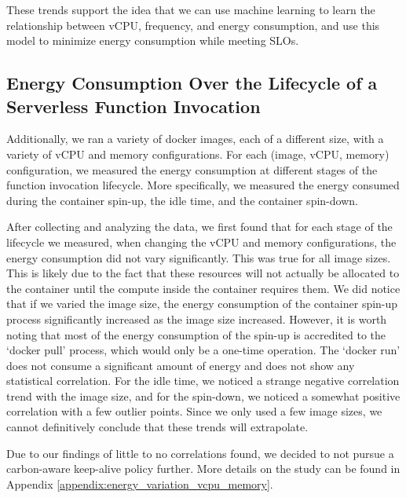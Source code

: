 \documentclass[times, 10pt,twocolumn]{article}
\begin{document}
These trends support the idea that we can use machine learning to learn the relationship between vCPU, frequency, and energy consumption, and use this model to minimize energy consumption while meeting SLOs.

\subsection{Energy Consumption Over the Lifecycle of a Serverless Function Invocation}
Additionally, we ran a variety of docker images, each of a different size, with a variety of vCPU and memory configurations. For each (image, vCPU, memory) configuration, we measured the energy consumption at different stages of the function invocation lifecycle. More specifically, we measured the energy consumed during the container spin-up, the idle time, and the container spin-down.

After collecting and analyzing the data, we first found that for each stage of the lifecycle we measured, when changing the vCPU and memory configurations, the energy consumption did not vary significantly. This was true for all image sizes. This is likely due to the fact that these resources will not actually be allocated to the container until the compute inside the container requires them. We did notice that if we varied the image size, the energy consumption of the container spin-up process significantly increased as the image size increased. However, it is worth noting that most of the energy consumption of the spin-up is accredited to the `docker pull' process, which would only be a one-time operation. The `docker run' does not consume a significant amount of energy and does not show any statistical correlation. For the idle time, we noticed a strange negative correlation trend with the image size, and for the spin-down, we noticed a somewhat positive correlation with a few outlier points. Since we only used a few image sizes, we cannot definitively conclude that these trends will extrapolate.

Due to our findings of little to no correlations found, we decided to not pursue a carbon-aware keep-alive policy further. More details on the study can be found in Appendix \ref{appendix:energy_variation_vcpu_memory}.



\end{document}
